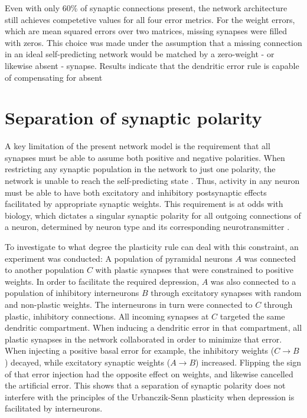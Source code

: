 Even with only 60\% of synaptic connections present, the network architecture still achieves competetive values for all
four error metrics. For the weight errors, which are mean squared errors over two matrices, missing synapses were filled
with zeros. This choice was made under the assumption that a missing connection in an ideal self-predicting network
would be matched by a zero-weight - or likewise absent - synapse. Results indicate that the dendritic error rule 
is capable of compensating for absent 


\section{Separation of synaptic polarity}

A key limitation of the present network model is the requirement that all synapses must be able to assume both positive
and negative polarities. When restricting any synaptic population in the network to just one polarity, the network is
unable to reach the self-predicting state . Thus, activity in any neuron must be able to have both
excitatory and inhibitory postsynaptic effects facilitated by appropriate synaptic weights. This requirement is at odds
with biology, which dictates a singular synaptic polarity for all outgoing connections of a neuron, determined by neuron
type and its corresponding neurotransmitter \citeme.


To investigate to what degree the plasticity rule can deal with this constraint, an experiment was conducted: A
population of pyramidal neurons $A$  was connected to another population $C$ with plastic synapses that were constrained
to positive weights. In order to facilitate the required depression, $A$ was also connected to a population of
inhibitory interneurons $B$ through excitatory synapses with random and non-plastic weights. The interneurons in turn
were connected to $C$ through plastic, inhibitory connections. All incoming synapses at $C$ targeted the same dendritic
compartment. When inducing a dendritic error in that compartment, all plastic synapses in the network collaborated in
order to minimize that error. When injecting a positive basal error for example, the inhibitory weights ($C \rightarrow
B$) decayed, while excitatory synaptic weights ($A \rightarrow B$) increased. Flipping the sign of that error injection
had the opposite effect on weights, and likewise cancelled the artificial error. This shows that a separation of
synaptic polarity does not interfere with the principles of the Urbanczik-Senn plasticity when depression is facilitated
by interneurons.

